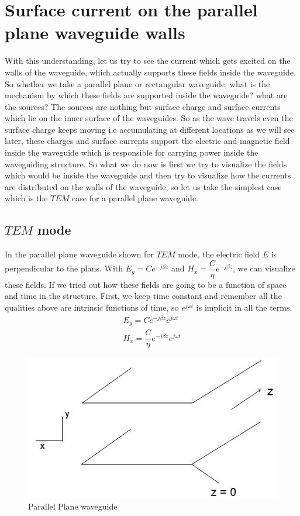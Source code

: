 \section{Surface current on the parallel plane waveguide walls}
With this understanding, let us try to see the current which gets excited on the walls of the waveguide, which actually supports these fields inside the waveguide. So whether we take a parallel plane or rectangular waveguide, what is the mechanism by which these fields are supported inside the waveguide? what are the sources? The sources are nothing but surface charge and surface currents which lie on the inner surface of the waveguides. So as the wave travels even the surface charge keeps moving i.e accumulating at different locations as we will see later, these charges and surface currents support the electric and magnetic field inside the waveguide which is responsible for carrying power inside the waveguiding structure. So what we do now is first we try to visualize the fields which would be inside the waveguide and then try to visualize how the currents are distributed on the walls of the waveguide, so let us take the simplest case which is the $TEM$ case for a parallel plane waveguide.

\subsection{$TEM$ mode}
In the parallel plane waveguide shown for $TEM$ mode, the electric field $E$ is perpendicular to the plans. With ${E_y = Ce^{-j\beta z}}$ and ${H_x = \dfrac{C}{\eta}e^{-j\beta z}}$, we can visualize these fields. If we tried out how these fields are going to be a function of space and time in the structure. First, we keep time constant and remember all the qualities above are intrinsic functions of time, so ${e^{j\omega t}}$ is implicit in all the terms.
\begin{align*}
E_y = Ce^{-j\beta z}e^{j\omega t}\\
H_x = {\dfrac{C}{\eta}}e^{-j\beta z} e^{j\omega t}
\end{align*}
\begin{figure}[h]
\centering
\includegraphics[width=.7\linewidth]{./graphics/page6}
\caption{Parallel Plane waveguide}
\label{fig:page6}
\end{figure}

